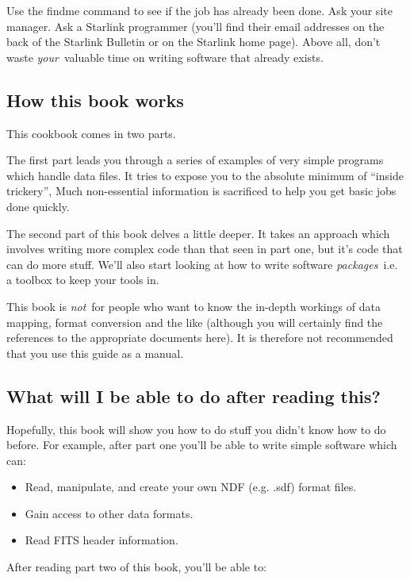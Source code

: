 Use the {\sf findme} command  to see if the job
has already been done.
Ask your site manager. Ask a Starlink programmer (you'll find their email
addresses on the back of the Starlink Bulletin or on the Starlink home
page). Above all, don't waste {\em your}\, valuable time on writing software
that already exists.

\subsection{How this book works}

This cookbook comes in two parts.

The first part leads you through a series of examples of very simple
programs which handle data files.
It tries to expose you to the absolute minimum
of ``inside trickery'',
Much non-essential information is sacrificed
to help you get basic jobs done quickly.

The second part of this book delves a little deeper.  It takes an approach
which involves writing more complex code than that seen in part one, but
it's code that can do more stuff. We'll also start looking at how to write
software {\em packages}\, i.e. a toolbox to keep your tools in.

This book is {\em not}\, for people who want to know the in-depth workings
of data mapping, format conversion and the like (although you will
certainly find the references to the appropriate documents here).  It is
therefore not recommended that you use this guide as a manual.

\subsection{What will I be able to do after reading this?}

Hopefully, this book will show you how to do stuff you didn't know how to do
before. For example, after part one you'll be able to write simple
software which can:

\begin{itemize}
\item Read, manipulate, and create your own NDF (e.g. .sdf) format files.
\item Gain access to other data formats.
\item Read FITS header information.
\end{itemize}

After reading part two of this book, you'll be able to:

